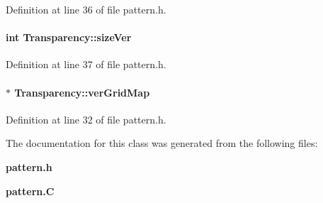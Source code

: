 Definition at line 36 of file pattern.h.\label{Transparency_m3}
\paragraph{\setlength{\rightskip}{0pt plus 5cm}int Transparency::size\-Ver}\hfill



Definition at line 37 of file pattern.h.\label{Transparency_m0}
\paragraph{ $\ast$ Transparency::ver\-Grid\-Map}\hfill



Definition at line 32 of file pattern.h.

The documentation for this class was generated from the following files:\begin{CompactItemize}
\item 
{\bf pattern.h}\item 
{\bf pattern.C}\end{CompactItemize}
